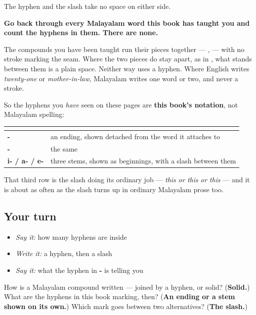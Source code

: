 The hyphen and the slash take no space on either side.

\begin{grammarlens}[title={Grammar Lens: two marks you have hardly seen}]
\textbf{Go back through every Malayalam word this book has taught you and count the hyphens in them. There are none.}

The compounds you have been taught run their pieces together — \textbf{}, \textbf{} — with no stroke marking the seam. Where the two pieces do stay apart, as in \textbf{ }, what stands between them is a plain space. Neither way uses a hyphen. Where English writes \emph{twenty-one} or \emph{mother-in-law}, Malayalam writes one word or two, and never a stroke.

So the hyphens you \emph{have} seen on these pages are \textbf{this book's notation}, not Malayalam spelling:

\noindent
\begin{tabularx}{\linewidth}{@{}>{\raggedright\arraybackslash}X>{\raggedright\arraybackslash}X@{}}
\toprule
\textbf{} & \textbf{} \\
\midrule
\textbf{-\ml{ിക്ക്}} & an ending, shown detached from the word it attaches to \\
\textbf{-\ml{ആൻ}} & the same \\
\textbf{i- / a- / e-} & three stems, shown as beginnings, with a slash between them \\
\bottomrule
\end{tabularx}

That third row is the slash doing its ordinary job — \emph{this or this or this} — and it is about as often as the slash turns up in ordinary Malayalam prose too.
\end{grammarlens}

\subsection*{Your turn}
\begin{itemize}
\raggedright
  \item \emph{Say it:} how many hyphens are inside \textbf{}
  \item \emph{Write it:} a hyphen, then a slash
  \item \emph{Say it:} what the hyphen in \textbf{-} is telling you
\end{itemize}

\begin{tcolorbox}[breakable,colback=teal!4,colframe=teal!35!black,title={Before you move on}]
How is a Malayalam compound written — joined by a hyphen, or solid? (\textbf{Solid.}) What are the hyphens in this book marking, then? (\textbf{An ending or a stem shown on its own.}) Which mark goes between two alternatives? (\textbf{The slash.})
\end{tcolorbox}
